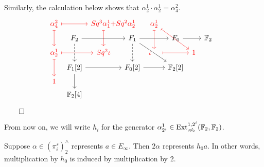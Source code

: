 \documentclass{MetricNotes2023}
\def\bb{\ensuremath\mathbb}
\def\A{\ensuremath{\mathscr{A}_2}}
\DeclareMathOperator{\Ext}{Ext}
\def\done{\begin{flushright}\vspace{-4.35ex}\(\qed\)\end{flushright}}
\def\textcolour{\textcolor}
\begin{document}
\begin{ourproof}
Similarly, the calculation below shows that \(\alpha^1_2\cdot \alpha^1_2=\alpha^2_4\).
\[\begin{tikzcd}[row sep = 0.8ex, column sep=0.8ex]
\textcolour{red}{\alpha^2_4} \arrow[rr, "", mapsto, red] \arrow[dd, swap, "", red, mapsto]  & & \textcolour{red}{Sq^3\alpha^1_1}\textcolour{red}{+}\mathrlap{\textcolour{red}{Sq^2\alpha^1_2}}  \arrow[dd, ""', red, mapsto] & & \textcolour{red}{\alpha^{1}_{2}}  \arrow[dd, ""', red, mapsto] \arrow[rrdd, "", red, mapsto] & && \\
& F_2 \arrow[rr, swap, ""] \arrow[dd, ""', dashrightarrow] & & F_{1} \arrow[dd, ""', dashrightarrow] \arrow[rr, ""'] \arrow[rrdd] & & F_0 \arrow[rr] && \bb{F}_2 \\
\textcolour{red}{\alpha^1_2} \arrow[rr, swap, "", red, mapsto] \arrow[dd, ""', red, mapsto] & & \textcolour{red}{Sq^2\iota} & & \textcolour{red}{\iota}\;\;\;\; \arrow[rr, ""', red, mapsto] & & \textcolour{red}{1} & & & \\
& F_1[2] \arrow[rr, swap, ""] \arrow[dd, ""'] & & F_0[2] \arrow[rr, ""'] & & \bb{F}_2[2] & &\\
\textcolour{red}{1} & &&&&&&\\
& \bb{F}_2[4] &&&&&&
\end{tikzcd}\]
\done
\end{ourproof}

From now on, we will write \(h_i\) for the generator \(\alpha^1_{2^i}\in \Ext^{1, 2^i}_{\A}(\bb{F}_2, \bb{F}_2)\).

\begin{proposition}
Suppose \(\alpha \in (\pi_i^s)^\wedge_2\) represents \(a \in E_\infty\). Then \(2\alpha\) represents \(h_0a\). In other words, multiplication by \(h_0\) is induced by multiplication by 2. 
\end{proposition}
\end{document}
